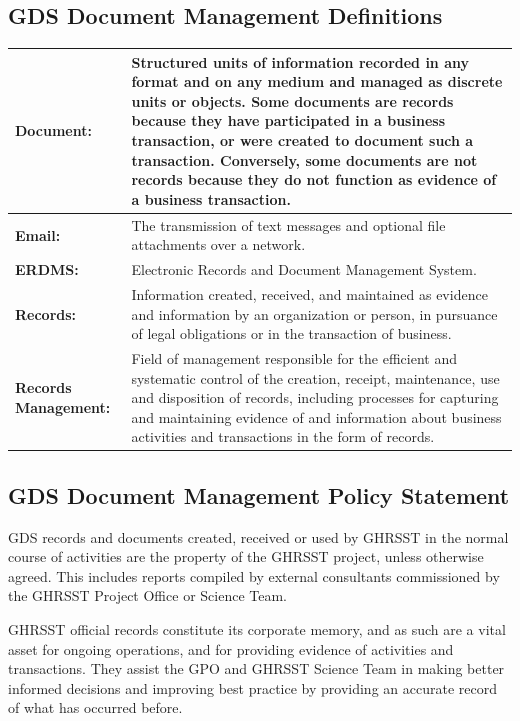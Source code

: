 \subsection{GDS Document Management Definitions}
\begin{longtable}{|p{}|p{}|}
    \label{tab:gds_document_definitions} \\
    \hline \endfirsthead
    \endhead
    \endfoot
    \hline \endlastfoot
    \textbf{Document: } & Structured units of information recorded in any
    format and on any medium and managed as discrete units or objects. Some documents are records because they have participated in a business transaction, or were created to document such a transaction. Conversely, some documents are not records because they do not function as evidence of a business transaction. \\ \hline
    \textbf{Email: } & The transmission of text messages and optional file attachments over a network. \\ \hline 
    \textbf{ERDMS: } & Electronic Records and Document Management System. \\ \hline 
    \textbf{Records:} & Information created, received, and maintained as evidence and information by an organization or person, in pursuance of legal obligations or in the transaction of business. \\ \hline
    \textbf{Records Management:} & Field of management responsible for the efficient and systematic control of the creation, receipt, maintenance, use and disposition of records, including processes for capturing and maintaining evidence of and information about business activities and transactions in the form of records.\\ 
\end{longtable}

\subsection{GDS Document Management Policy Statement}
GDS records and documents created, received or used by GHRSST in the normal course of activities
are the property of the GHRSST project, unless otherwise agreed. This includes reports compiled by
external consultants commissioned by the GHRSST Project Office or Science Team. 
\newp

GHRSST official records constitute its corporate memory, and as such are a vital asset for ongoing
operations, and for providing evidence of activities and transactions. They assist the GPO and GHRSST Science Team in making better informed decisions and improving best practice by providing an accurate record of what has occurred before.
\newp

